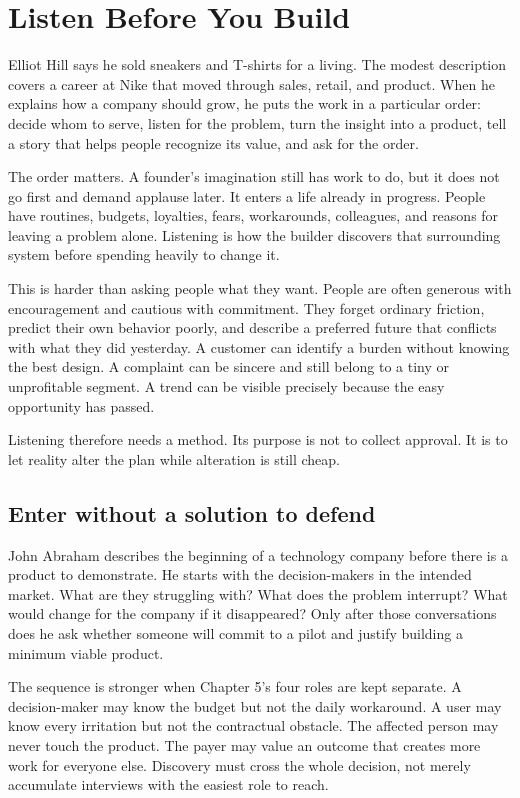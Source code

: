 \chapter{Listen Before You Build}

Elliot Hill says he sold sneakers and T-shirts for a living. The modest
description covers a career at Nike that moved through sales, retail, and
product. When he explains how a company should grow, he puts the work in a
particular order: decide whom to serve, listen for the problem, turn the insight
into a product, tell a story that helps people recognize its value, and ask for
the order.

The order matters. A founder's imagination still has work to do, but it does
not go first and demand applause later. It enters a life already in progress.
People have routines, budgets, loyalties, fears, workarounds, colleagues, and
reasons for leaving a problem alone. Listening is how the builder discovers
that surrounding system before spending heavily to change it.

This is harder than asking people what they want. People are often generous
with encouragement and cautious with commitment. They forget ordinary
friction, predict their own behavior poorly, and describe a preferred future
that conflicts with what they did yesterday. A customer can identify a burden
without knowing the best design. A complaint can be sincere and still belong
to a tiny or unprofitable segment. A trend can be visible precisely because the
easy opportunity has passed.

Listening therefore needs a method. Its purpose is not to collect approval. It
is to let reality alter the plan while alteration is still cheap.

\section{Enter without a solution to defend}

John Abraham describes the beginning of a technology company before there is a
product to demonstrate. He starts with the decision-makers in the intended
market. What are they struggling with? What does the problem interrupt? What
would change for the company if it disappeared? Only after those conversations
does he ask whether someone will commit to a pilot and justify building a
minimum viable product.

The sequence is stronger when Chapter 5's four roles are kept separate. A
decision-maker may know the budget but not the daily workaround. A user may
know every irritation but not the contractual obstacle. The affected person
may never touch the product. The payer may value an outcome that creates more
work for everyone else. Discovery must cross the whole decision, not merely
accumulate interviews with the easiest role to reach.

